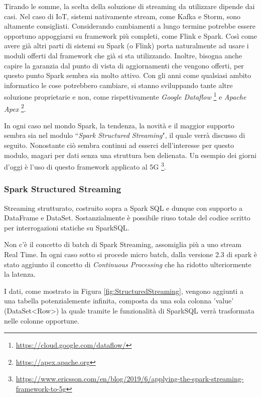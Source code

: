 \documentclass[12pt,italian]{article}
\begin{document}
Tirando le somme, la scelta della soluzione di streaming da utilizzare dipende dai casi. Nel caso di IoT, sistemi nativamente stream, come Kafka e Storm, sono altamente consigliati. Considerando cambiamenti a lungo termine potrebbe essere opportuno appoggiarsi su framework più completi, come Flink e Spark. Così come avere già altri parti di sistemi su Spark (o Flink) porta naturalmente ad usare i moduli offerti dal framework che già si sta utilizzando.
Inoltre, bisogna anche capire la garanzia dal punto di vista di aggiornamenti che vengono offerti, per questo punto Spark sembra sia molto attivo.
Con gli anni come qualsiasi ambito informatico le cose potrebbero cambiare, si stanno sviluppando tante altre soluzione proprietarie e non, come rispettivamente \textit{Google Dataflow} \footnote{\url{https://cloud.google.com/dataflow/}} e \textit{Apache Apex} \footnote{\url{https://apex.apache.org}}.
\par In ogni caso nel mondo Spark, la tendenza, la novità e il maggior supporto sembra sia nel modulo ``\textit{Spark Structured Streaming}", il quale verrà discusso di seguito.
Nonostante ciò sembra continui ad esserci dell'interesse per questo modulo, magari per dati senza una struttura ben delienata. Un esempio dei giorni d'oggi è l'uso di questo framework applicato al 5G \footnote{\url{https://www.ericsson.com/en/blog/2019/6/applying-the-spark-streaming-framework-to-5g}}.


\subsubsection{Spark Structured Streaming}\label{sec:structuredstreaming}
Streaming strutturato, costruito sopra a Spark SQL e dunque con supporto a DataFrame e DataSet. 
Sostanzialmente è possibile riuso totale del codice scritto per interrogazioni statiche su SparkSQL.

Non c'è il concetto di batch di Spark Streaming, assomiglia più a uno stream Real Time.
In ogni caso sotto si procede micro batch, dalla versione 2.3 di spark è stato aggiunto il concetto di \textit{Continuous Processing} che ha ridotto ulteriormente la latenza.

I dati, come mostrato in Figura \ref{fig:StructuredStreaming}, vengono aggiunti a una tabella potenzialemente infinita, composta da una sola colonna 'value' (DataSet<Row>) %
la quale tramite le funzionalità di SparkSQL verrà trasformata nelle colonne opportune.
\end{document}
